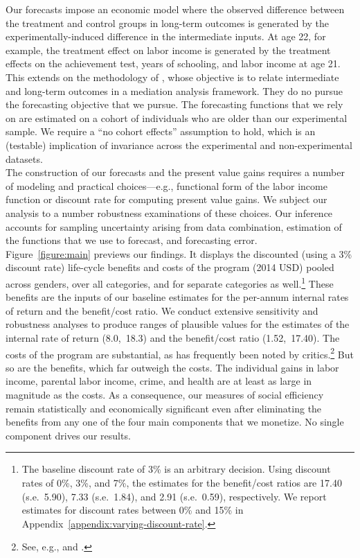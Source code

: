 \noindent Our forecasts impose an economic model where the observed difference between the treatment and control groups in long-term outcomes is generated by the experimentally-induced difference in the intermediate inputs. At age 22, for example, the treatment effect on labor income is generated by the treatment effects on the achievement test, years of schooling, and labor income at age 21. This extends on the methodology of \citet{Heckman_Pinto_etal_2013_PerryFactor}, whose objective is to  relate intermediate and long-term outcomes in a mediation analysis framework. They do no pursue the forecasting objective that we pursue. The forecasting functions that we rely on are estimated on a cohort of individuals who are older than our experimental sample. We require a ``no cohort effects'' assumption to hold, which is an (testable) implication of invariance across the experimental and non-experimental datasets.\\ 

\noindent The construction of our forecasts and the present value gains requires a number of modeling and practical choices---e.g., functional form of the labor income function or discount rate for computing present value gains. We subject our analysis to a number robustness examinations of these choices. Our inference accounts for sampling uncertainty arising from data combination, estimation of the functions that we use to forecast, and forecasting error.\\

\noindent Figure~\ref{figure:main} previews our findings. It displays the discounted (using a 3\% discount rate) life-cycle benefits and costs of the program (2014 USD) pooled across genders, over all categories, and for separate categories as well.\footnote{The baseline discount rate of 3\% is an arbitrary decision. Using discount rates of 0\%, 3\%, and 7\%, the estimates for the benefit/cost ratios are 17.40 (s.e.\ 5.90), 7.33 (s.e.\ 1.84), and 2.91 (s.e.\ 0.59), respectively. We report estimates for discount rates between 0\% and 15\% in  Appendix~\ref{appendix:varying-discount-rate}.} These benefits are the inputs of our baseline estimates for the per-annum internal rates of return and the benefit/cost ratio. We conduct extensive sensitivity and robustness analyses to produce ranges of plausible values for the estimates of the internal rate of return (8.0,\ 18.3) and the benefit/cost ratio (1.52,\ 17.40). The costs of the program are substantial, as has frequently been noted by critics.\footnote{See, e.g., \citet{Fox_News_2014_Head_Start_Effects} and \citet{Whitehurst_2014_Senate_Testimony}.} But so are the benefits, which far outweigh the costs. The individual gains in labor income, parental labor income, crime, and health are at least as large in magnitude as the costs. As a consequence, our measures of social efficiency remain statistically and economically significant even after eliminating the benefits from any one of the four main components that we monetize. No single component drives our results.\\

